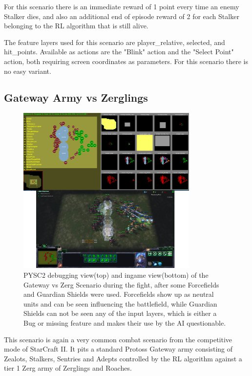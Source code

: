 For this scenario there is an immediate reward of 1 point every time an enemy Stalker dies, and also an additional end of episode reward of 2 for each Stalker belonging to the RL algorithm that is still alive.

The feature layers used for this scenario are player\_relative, selected, and hit\_points.
Available as actions are the "Blink" action and the "Select Point" action, both requiring screen coordinates as parameters. For this scenario there is no easy variant.

\subsection{Gateway Army vs Zerglings}
\begin{figure}[htb]
  \centering
      \includegraphics[width=0.8\textwidth]{Figures/GatewayZerg2.png}
  \caption{PYSC2 debugging view(top) and ingame view(bottom) of the Gateway vs Zerg Scenario during the fight, after some Forcefields and Guardian Shields were used. Forcefields show up as neutral units and can be seen influencing the battlefield, while Guardian Shields can not be seen any of the input layers, which is either a Bug or missing feature and makes their use by the AI questionable. }
\end{figure}

This scenario is again a very common combat scenario from the competitive mode of StarCraft II.
It pits a standard Protoss Gateway army consisting of Zealots, Stalkers, Sentries and Adepts controlled by the RL algorithm against a tier 1 Zerg army of Zerglings and Roaches. 

